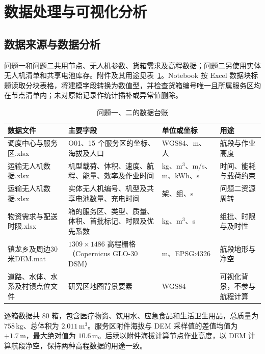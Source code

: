 \documentclass[bwprint,fontset=windows]{gmcmthesis}
\begin{document}
\vspace{\baselineskip}

\section{数据处理与可视化分析}

\subsection{数据来源与数据分析}

问题一和问题二共用节点、无人机参数、货箱需求及高程数据；问题二另使用实体无人机清单和共享电池库存。附件及其用途见表~\ref{tab:data-ledger}。Notebook 按 Excel 数据块标题读取分块表格，将建模字段转换为数值型，并检查货箱编号唯一且所属服务区均在节点清单内；未对原始记录作统计插补或异常值删除。

\begin{table}[htp!]
\centering
\caption{问题一、二的数据台账}
\label{tab:data-ledger}
\small
\begin{tabularx}{\textwidth}{
  >{\centering\arraybackslash}p{}
  >{\centering\arraybackslash}X
  >{\centering\arraybackslash}p{}
  >{\centering\arraybackslash}p{}
}
\toprule
数据文件 & 主要字段 & 单位或坐标 & 用途 \\
\midrule
调度中心与服务区.xlsx
& O01、15 个服务区的坐标、海拔及人口
& WGS84、m、人
& 航段与作业高度 \\
运输无人机数据.xlsx
& 机型载荷、体积、速度、航程、能量、效率及作业时间
& kg、m$^3$、m/s、m、kWh、s
& 时间、能耗与载荷约束 \\
运输无人机数据.xlsx
& 实体无人机编号、机型及共享电池数量、充电时间
& 架、组、s
& 问题二资源周转 \\
物资需求与配送时限.xlsx
& 80 箱的服务区、类型、质量、体积、首批标记、时限及优先系数
& kg、m$^3$、s
& 组批、时限与及时性 \\
镇龙乡及周边30米DEM.mat
& $1309\times1486$ 高程栅格（Copernicus GLO-30 DSM）
& m、EPSG:4326
& 航段地形与净空 \\
道路、水体、水系及村镇点位文件
& 研究区地图背景要素
& WGS84
& 可视化背景，不参与航程计算 \\
\bottomrule
\end{tabularx}
\end{table}

逐箱数据共 80 箱，包含医疗物资、饮用水、应急食品和生活卫生用品，总质量为 $758\,\mathrm{kg}$、总体积为 $2.011\,\mathrm{m^3}$。服务区附件海拔与 DEM 采样值的差值均值为 $+1.7\,\mathrm{m}$，最大绝对值为 $10.6\,\mathrm{m}$。后续以附件海拔计算节点作业高度，以 DEM 计算航段净空，保持两种高程数据的用途一致。
\end{document}
